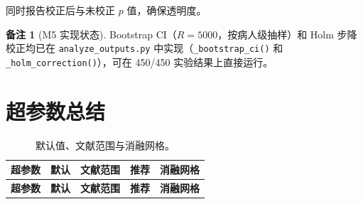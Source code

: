 \documentclass[11pt,a4paper]{article}
\theoremstyle{definition}
\newtheorem{remark}{备注}[section]
\begin{document}
同时报告校正后与未校正 $p$ 值，确保透明度。

\begin{remark}[M5 实现状态]
Bootstrap CI（$R=5000$，按病人级抽样）和 Holm 步降校正均已在 \texttt{analyze\_outputs.py} 中实现（\texttt{\_bootstrap\_ci()} 和 \texttt{\_holm\_correction()}），可在 450/450 实验结果上直接运行。
\end{remark}


\section{超参数总结}

\begin{longtable}{p{3.6cm}cp{3cm}cp{3.6cm}}
\caption{默认值、文献范围与消融网格。}\label{tab:hyper}\\
\toprule
\textbf{超参数} & \textbf{默认} & \textbf{文献范围} & \textbf{推荐} & \textbf{消融网格} \\
\midrule\endfirsthead
\toprule
\textbf{超参数} & \textbf{默认} & \textbf{文献范围} & \textbf{推荐} & \textbf{消融网格} \\
\midrule\endhead


\end{longtable}
\end{document}
